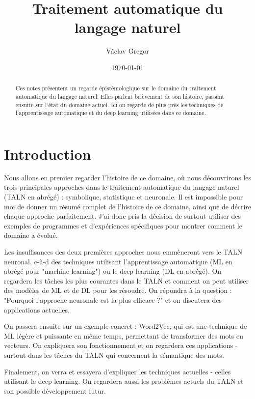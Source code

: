 \documentclass[11pt,a4paper]{report}
\title{Traitement automatique du langage naturel}
\author{Václav Gregor}
\date{\today}
\begin{document}
\maketitle
\tableofcontents

\begin{abstract}
  Ces notes présentent un regarde épistémologique sur le domaine du traitement automatique du langage naturel. 
  Elles parlent brièvement de son histoire, passant ensuite sur l'état du domaine actuel. Ici on regarde de plus près 
  les techniques de l'apprentissage automatique et du deep learning utilisées dans ce domaine.
\end{abstract}

\chapter{Introduction}
  Nous allons en premier regarder l'histoire de ce domaine, où nous découvrirons
  les trois principales approches dans le traitement automatique du langage 
  naturel (TALN en abrégé) : symbolique, statistique et neuronale. 
  Il est impossible pour moi de donner un résumé complet de l'histoire de ce domaine, 
  ainsi que de décrire chaque approche parfaitement. J'ai donc pris la décision de surtout 
  utiliser des exemples de programmes et d'expériences spécifiques pour montrer 
  comment le domaine a évolué. 

  Les insuffisances des deux premières approches nous emmèneront vers le TALN neuronal, 
  c-à-d des techniques utilisant l'apprentissage automatique (ML en abrégé pour "machine learning") ou 
  le deep learning (DL en abrégé). On regardera les tâches les plus courantes dans le TALN et comment 
  on peut utiliser des modèles de ML et de DL pour les résoudre. 
  On répondra à la question : "Pourquoi l'approche neuronale est la plus efficace ?" 
  et on discutera des applications actuelles. 
  
  On passera ensuite sur un exemple concret : Word2Vec, qui est une technique de ML légère et 
  puissante en même temps, permettant de transformer des mots en vecteurs. 
  On expliquera son fonctionnement et on regardera ces applications - surtout dans les tâches 
  du TALN qui concernent la sémantique des mots.

  Finalement, on verra et essayera d'expliquer les techniques actuelles - celles utilisant le deep learning.  
  On regardera aussi les problèmes actuels du TALN et son possible développement futur.  
\cite{A-Brief-History-of-NLP}
\cite{MUNI-NLP}
\cite{NLP-Stanford-website}
\cite{NLP-Wikipedia}
\cite{QM-chatbots-and-no}
\cite{QM-NN-learn-like-humans}
\cite{QM-tiny-language-models}
\end{document}
